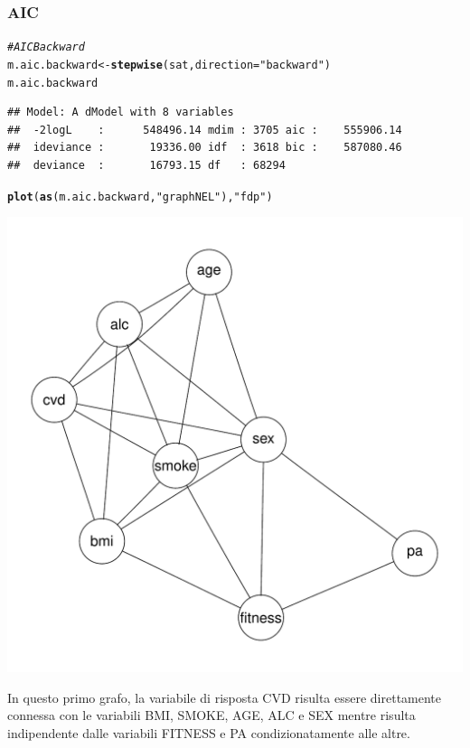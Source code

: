 \documentclass{article}\usepackage[]{graphicx}\usepackage[]{xcolor}
\makeatletter
\def\maxwidth{ %
  \ifdim\Gin@nat@width>\linewidth
    \linewidth
  \else
    \Gin@nat@width
  \fi
}
\newcommand{\hlstr}[1]{\textcolor[rgb]{0.192,0.494,0.8}{#1}}%
\newcommand{\hlcom}[1]{\textcolor[rgb]{0.678,0.584,0.686}{\textit{#1}}}%
\newcommand{\hlstd}[1]{\textcolor[rgb]{0.345,0.345,0.345}{#1}}%
\newcommand{\hlkwb}[1]{\textcolor[rgb]{0.69,0.353,0.396}{#1}}%
\newcommand{\hlkwc}[1]{\textcolor[rgb]{0.333,0.667,0.333}{#1}}%
\newcommand{\hlkwd}[1]{\textcolor[rgb]{0.737,0.353,0.396}{\textbf{#1}}}%
\newenvironment{kframe}{%
 \def\at@end@of@kframe{}%
 \ifinner\ifhmode%
  \def\at@end@of@kframe{\end{minipage}}%
  \begin{minipage}{\columnwidth}%
 \fi\fi%
 \def\FrameCommand##1{\hskip\@totalleftmargin \hskip-\fboxsep
 \colorbox{shadecolor}{##1}\hskip-\fboxsep
     \hskip-\linewidth \hskip-\@totalleftmargin \hskip\columnwidth}%
 \MakeFramed {\advance\hsize-\width
   \@totalleftmargin\z@ \linewidth\hsize
   \@setminipage}}%
 {\par\unskip\endMakeFramed%
 \at@end@of@kframe}
\newenvironment{knitrout}{}{} %
\makeatother
\begin{document}
    \subsubsection{AIC}
\begin{knitrout}
\color{fgcolor}\begin{kframe}
\begin{alltt}
\hlcom{#AIC Backward}
\hlstd{m.aic.backward} \hlkwb{<-} \hlkwd{stepwise}\hlstd{(sat,} \hlkwc{direction}\hlstd{=}\hlstr{"backward"}\hlstd{)}
\hlstd{m.aic.backward}
\end{alltt}
\begin{verbatim}
## Model: A dModel with 8 variables
##  -2logL    :      548496.14 mdim : 3705 aic :    555906.14 
##  ideviance :       19336.00 idf  : 3618 bic :    587080.46 
##  deviance  :       16793.15 df   : 68294
\end{verbatim}
\begin{alltt}
\hlkwd{plot}\hlstd{(}\hlkwd{as}\hlstd{(m.aic.backward,} \hlstr{"graphNEL"}\hlstd{),} \hlstr{"fdp"}\hlstd{)}
\end{alltt}
\end{kframe}
\includegraphics[width=\maxwidth]{figure/Grafo_AIC_Backward-1} 
\end{knitrout}
      
      In questo primo grafo, la variabile di risposta CVD risulta essere
      direttamente connessa con le variabili BMI, SMOKE, AGE, ALC e SEX mentre
      risulta indipendente dalle variabili FITNESS e PA condizionatamente alle
      altre.
      
\end{document}
